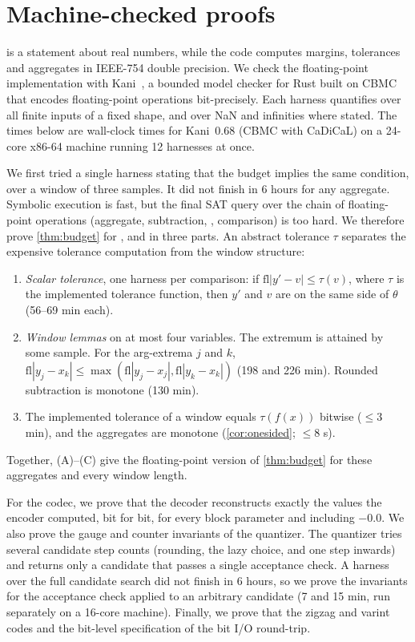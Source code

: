 \section{Machine-checked proofs}
\label{sec:verification}

 is a statement about real numbers, while the code
computes margins, tolerances and aggregates in IEEE-754 double precision.
We check the floating-point implementation with
Kani~\cite{vanhattum2022kani}, a bounded model checker for Rust built on
CBMC~\cite{kroening2014cbmc} that encodes floating-point operations
bit-precisely. Each harness quantifies over all finite inputs of a fixed
shape, and over NaN and infinities where stated. The times below are
wall-clock times for Kani~0.68 (CBMC with CaDiCaL) on a 24-core x86-64
machine running 12 harnesses at once.

We first tried a single harness stating that the budget implies the same
condition, over a window of three samples. It did not finish in 6 hours for
any aggregate. Symbolic execution is fast, but the final SAT query over the
chain of floating-point operations (aggregate, subtraction,
, comparison) is too hard. We therefore prove
\cref{thm:budget} for ,  and
 in three parts. An abstract tolerance $\tau$
separates the expensive tolerance computation from the window structure:
\begin{enumerate}
  \item[(A)] \emph{Scalar tolerance}, one harness per comparison: if
    $\mathrm{fl}|y' - v| \le \tau(v)$, where $\tau$ is the implemented
    tolerance function, then $y'$ and $v$ are on the same side of $\theta$
    (56--69 min each).
  \item[(B)] \emph{Window lemmas} on at most four variables. The extremum
    is attained by some sample. For the arg-extrema $j$ and $k$,
    $\mathrm{fl}|y_j - x_k| \le
    \max(\mathrm{fl}|y_j - x_j|, \mathrm{fl}|y_k - x_k|)$ (198 and
    226 min). Rounded subtraction is monotone (130 min).
  \item[(C)] The implemented tolerance of a window equals $\tau(f(x))$
    bitwise ($\le 3$ min), and the aggregates are monotone
    (\cref{cor:onesided}; $\le 8$ s).
\end{enumerate}
Together, (A)--(C) give the floating-point version of \cref{thm:budget}
for these aggregates and every window length.

For the codec, we prove that the decoder reconstructs exactly the values
the encoder computed, bit for bit, for every block parameter and including
$-0.0$. We also prove the gauge and counter invariants of the quantizer.
The quantizer tries several candidate step counts (rounding, the lazy
choice, and one step inwards) and returns only a candidate
that passes a single acceptance check. A harness over the full candidate
search did not finish in 6 hours, so we prove the invariants for the
acceptance check applied to an arbitrary candidate (7 and 15 min, run
separately on a 16-core machine). Finally, we prove that the zigzag and
varint codes and the bit-level specification of the bit I/O round-trip.

